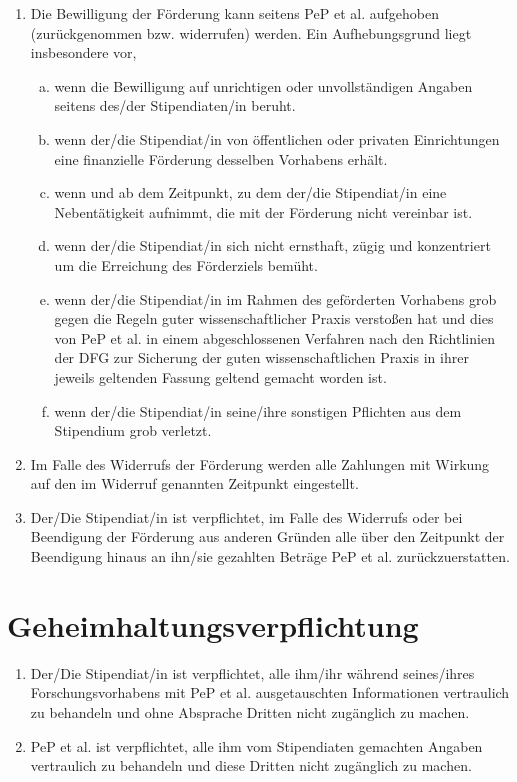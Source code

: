 \documentclass[
  paper=a4,
  fontsize=12pt,
  DIV=16,
  parskip=full,
  headinclude=true,
]{scrartcl}
\begin{document}
\begin{enumerate}[\qquad(1)]
	\item Die Bewilligung der Förderung kann seitens PeP et al. aufgehoben
		(zurückgenommen bzw. widerrufen) werden. Ein Aufhebungsgrund
		liegt insbesondere vor,
		\begin{enumerate}[(a)]
			\item wenn die Bewilligung auf unrichtigen oder
				unvollständigen Angaben seitens des/der
				Stipendiaten/in beruht.
			\item wenn der/die Stipendiat/in von öffentlichen oder
				privaten Einrichtungen eine finanzielle Förderung
				desselben Vorhabens erhält.
			\item wenn und ab dem Zeitpunkt, zu dem der/die Stipendiat/in
				eine Nebentätigkeit aufnimmt, die mit der Förderung
				nicht vereinbar ist.
			\item wenn der/die Stipendiat/in sich nicht ernsthaft,
				zügig und konzentriert um die Erreichung des
				Förderziels bemüht.
			\item wenn der/die Stipendiat/in im Rahmen des geförderten
				Vorhabens grob gegen die Regeln guter wissenschaftlicher
				Praxis verstoßen hat und dies von PeP et al. in einem
				abgeschlossenen Verfahren nach den Richtlinien
				der DFG zur Sicherung der guten wissenschaftlichen
				Praxis in ihrer jeweils geltenden Fassung geltend
				gemacht worden ist.
			\item wenn der/die Stipendiat/in seine/ihre sonstigen Pflichten
				aus dem Stipendium grob verletzt.
		\end{enumerate}
	\item Im Falle des Widerrufs der Förderung werden alle Zahlungen mit Wirkung
		auf den im Widerruf genannten Zeitpunkt eingestellt.
	\item Der/Die Stipendiat/in ist verpflichtet, im Falle des Widerrufs oder
		bei Beendigung der Förderung aus anderen Gründen alle über den
		Zeitpunkt der Beendigung hinaus an ihn/sie gezahlten Beträge 
		PeP et al. zurückzuerstatten.
\end{enumerate}

\section{Geheimhaltungsverpflichtung}

\begin{enumerate}[\qquad(1)]
	\item Der/Die Stipendiat/in ist verpflichtet, alle ihm/ihr während
		seines/ihres Forschungsvorhabens mit PeP et al. ausgetauschten
		Informationen vertraulich zu behandeln und ohne Absprache
		Dritten nicht zugänglich zu machen.
	\item PeP et al. ist verpflichtet, alle ihm vom Stipendiaten gemachten
		Angaben vertraulich zu behandeln und diese Dritten nicht
		zugänglich zu machen.
\end{enumerate}
\end{document}
